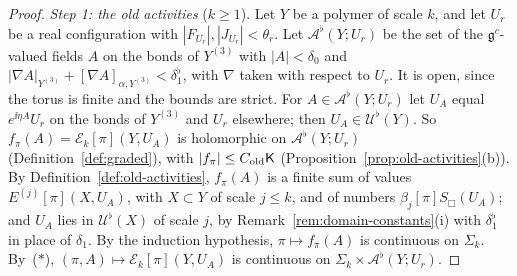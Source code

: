 \begin{proof}
\emph{Step 1: the old activities} ($k\ge1$). Let $Y$ be a polymer of scale $k$, and let $U_r$ be a real configuration with $|F_{U_r}|,|J_{U_r}|<\theta_r$. Let $\mathcal A^\flat(Y;U_r)$ be the set of the $\mathfrak g^c$-valued fields $A$ on the bonds of $Y^{(3)}$ with $|A|<\delta_0$ and $|\nabla A|_{Y^{(3)}}+[\nabla A]_{\alpha,Y^{(3)}}<\delta_1^\flat$, with $\nabla$ taken with respect to $U_r$. It is open, since the torus is finite and the bounds are strict. For $A\in\mathcal A^\flat(Y;U_r)$ let $U_A$ equal $e^{\ii\eta A}U_r$ on the bonds of $Y^{(3)}$ and $U_r$ elsewhere; then $U_A\in\mathcal U^\flat(Y)$. So $f_\pi(A)=\mathcal E_k[\pi](Y,U_A)$ is holomorphic on $\mathcal A^\flat(Y;U_r)$ (Definition~\ref{def:graded}), with $|f_\pi|\le C_{\rm old}\mathsf K$ (Proposition~\ref{prop:old-activities}(b)). By Definition~\ref{def:old-activities}, $f_\pi(A)$ is a finite sum of values $E^{(j)}[\pi](X,U_A)$, with $X\subset Y$ of scale $j\le k$, and of numbers $\beta_j[\pi]S_\Box(U_A)$; and $U_A$ lies in $\mathcal U^\flat(X)$ of scale $j$, by Remark~\ref{rem:domain-constants}(i) with $\delta_1^\flat$ in place of $\delta_1$. By the induction hypothesis, $\pi\mapsto f_\pi(A)$ is continuous on $\Sigma_k$. By~($*$), $(\pi,A)\mapsto\mathcal E_k[\pi](Y,U_A)$ is continuous on $\Sigma_k\times\mathcal A^\flat(Y;U_r)$.


\end{proof}
